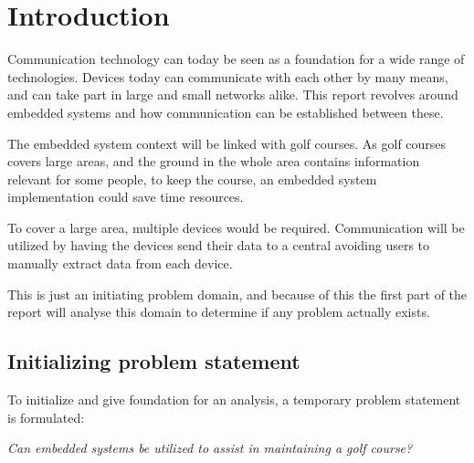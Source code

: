 \chapter{Introduction}
Communication technology can today be seen as a foundation for a wide range of technologies. Devices today can communicate with each other by many means, and can take part in large and small networks alike. This report revolves around embedded systems and how communication can be established between these.

The embedded system context will be linked with golf courses. As golf courses covers large areas, and the ground in the whole area contains information relevant for some people, to keep the course, an embedded system implementation could save time resources. 

To cover a large area, multiple devices would be required. Communication will be utilized by having the devices send their data to a central avoiding users to manually extract data from each device.

This is just an initiating problem domain, and because of this the first part of the report will analyse this domain to determine if any problem actually exists.


\section*{Initializing problem statement}
To initialize and give foundation for an analysis, a temporary problem statement is formulated:

\textit{Can embedded systems be utilized to assist in maintaining a golf course?}


